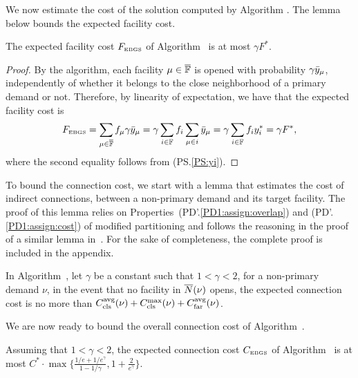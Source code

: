 \smallskip

We now estimate the cost of the solution computed by Algorithm {\EBGS}. The lemma
below bounds the expected facility cost.

\begin{lemma} \label{lem: EBGS facility cost}
The expected facility cost $F_{\mbox{\tiny\rm EBGS}}$ of Algorithm~{\EBGS} is at most $\gamma F^\ast$.
\end{lemma}

\begin{proof}
By the algorithm, each facility $\mu\in \overline{\mathbb{F}}$ is opened with
probability $\gamma {\bar y}_{\mu}$, independently of whether it belongs to the
close neighborhood of a primary demand or not. Therefore, by
  linearity of expectation, we have that the expected facility cost is
%
\begin{equation*}
	F_{\mbox{\tiny\rm EBGS}} = \sum_{\mu \in \overline{\mathbb{F}}} f_\mu \gamma {\bar y}_{\mu} 
			= \gamma \sum_{i\in \mathbb{F}} f_i \sum_{\mu\in i} {\bar y}_{\mu} 
			= \gamma \sum_{i \in \mathbb{F}} f_i y_i^\ast = \gamma F^\ast,
\end{equation*}
%
where the second equality follows from (PS.\ref{PS:yi}).
\end{proof}


To bound the connection cost, we start with a lemma that estimates the
cost of indirect connections, between a non-primary demand and its
target facility. The proof of this lemma relies on
Properties~(PD'.\ref{PD1:assign:overlap}) and
(PD'.\ref{PD1:assign:cost}) of modified partitioning and follows the
reasoning in the proof of a similar lemma
in~\cite{ByrkaGS10,ByrkaA10}.  For the sake of completeness, the
complete proof is included in the appendix.

\begin{lemma}\label{lem: EBGS target connection cost}
  In Algorithm~{\EBGS}, let $\gamma$ be a constant such that $1 <
  \gamma < 2$, for a non-primary demand $\nu$, in the event that no
  facility in ${\overline{N}}(\nu)$ opens, the expected connection cost is no
  more than $C_{{\mbox{\scriptsize\rm cls}}}^{{\mbox{\scriptsize\rm avg}}}(\nu)+C_{{\mbox{\scriptsize\rm cls}}}^{\max}(\nu)+C_{{\mbox{\scriptsize\rm far}}}^{{\mbox{\scriptsize\rm avg}}}(\nu)$.
\end{lemma}

We are now ready to bound the overall connection cost of Algorithm~{\EBGS}.

\begin{lemma}\label{lem: EBGS connection cost}
  Assuming that $1 < \gamma < 2$, the expected connection
  cost $C_{\mbox{\tiny\rm EBGS}}$ of Algorithm~{\EBGS} is at most
  $C^\ast\cdot\max\{\frac{1/e+1/e^\gamma}{1-1/\gamma},
  1+\frac{2}{e^\gamma}\}$.
\end{lemma}

